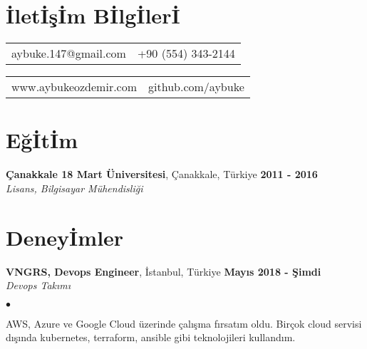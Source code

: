 \documentclass[margin,line]{res}
\newenvironment{list2}{
  \begin{list}{$\bullet$}{%
      \setlength{\itemsep}{0in}
      \setlength{\parsep}{0in} \setlength{\parskip}{0in}
      \setlength{\topsep}{0in} \setlength{\partopsep}{0in}
      \setlength{\leftmargin}{0.1in}}}{\end{list}}
\begin{document}
\small
{}

\begin{resume}
\section{\sc \.{I}let\.{I}\c{s}\.{I}m B\.{I}lg\.{I}ler\.{I}}
\begin{tabular}{@{}p{2in}p{3.8in}}
aybuke.147@gmail.com & {\hfill{\it}  +90 (554) 343-2144} \\
\end{tabular}
\begin{tabular}{@{}p{2in}p{3.8in}}
www.aybukeozdemir.com & {\hfill{\it}  github.com/aybuke} \\
\end{tabular}

\vspace*{-.3cm}
\section{\sc E\u{g}\.{I}t\.{I}m}

{\bf \c{C}anakkale 18 Mart \"{U}niversitesi}, \c{C}anakkale, T\"{u}rkiye  \hfill {\bf 2011 - 2016} \\

\vspace*{-.7cm}
{\em Lisans, Bilgisayar M\"{u}hendisli\u{g}i} \hfill {\ } \\
\vspace*{-.09in}
\vspace*{-.3cm}


\vspace*{-.3cm}
\section{\sc Deney\.{I}mler}

{\bf VNGRS, Devops Engineer}, \.{I}stanbul, T\"{u}rkiye \hfill {\bf May{\i}s 2018 - \c{S}imdi}\\

\vspace{-.7cm}
{\em Devops Tak{\i}m{\i} }
\vspace*{+.05in}
\begin{list2}
\item AWS, Azure ve Google Cloud \"{u}zerinde \c{c}al{\i}\c{s}ma f{\i}rsat{\i}m oldu. Bir\c{c}ok cloud servisi d{\i}\c{s}{\i}nda kubernetes, terraform, ansible gibi teknolojileri kulland{\i}m.
\end{list2}


\end{resume}
\end{document}
